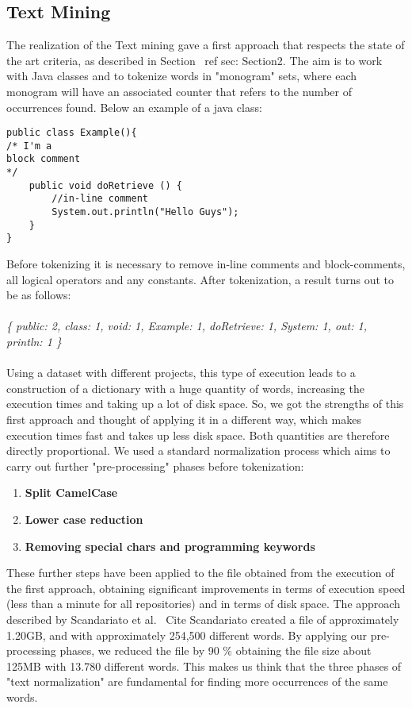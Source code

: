 \documentclass[twocolumn,10pt]{asme2ej}
\begin{document}
\subsection{Text Mining}\label{m:tm}

The realization of the Text mining gave a first approach that respects the state of the art criteria, as described in Section \ ref {sec: Section2}. The aim is to work with Java classes and to tokenize words in "monogram" sets, where each monogram will have an associated counter that refers to the number of occurrences found. Below an example of a java class:
\begin{lstlisting}
public class Example(){
/* I'm a
block comment
*/
    public void doRetrieve () {
        //in-line comment
        System.out.println("Hello Guys");
    }
}
\end{lstlisting}
Before tokenizing it is necessary to remove in-line comments and block-comments, all logical operators and any constants. After tokenization, a result turns out to be as follows:\\
\\\textit{\{ public: 2, class: 1, void: 1, Example: 1, doRetrieve: 1, System: 1, out: 1, println: 1 \}}\\
\\
Using a dataset with different projects, this type of execution leads to a construction of a dictionary with a huge quantity of words, increasing the execution times and taking up a lot of disk space. So, we got the strengths of this first approach and thought of applying it in a different way, which makes execution times fast and takes up less disk space. Both quantities are therefore directly proportional. We used a standard normalization process which aims to carry out further "pre-processing" phases before tokenization:
\begin{enumerate}
    \item \textbf{Split CamelCase }
    \item \textbf{Lower case reduction}
    \item \textbf{Removing special chars and programming keywords}
\end{enumerate}
These further steps have been applied to the file obtained from the execution of the first approach, obtaining significant improvements in terms of execution speed (less than a minute for all repositories) and in terms of disk space. The approach described by Scandariato et al. \ Cite {Scandariato} created a file of approximately 1.20GB, and with approximately 254,500 different words. By applying our pre-processing phases, we reduced the file by 90 \% obtaining the file size about 125MB with 13.780 different words. This makes us think that the three phases of "text normalization" are fundamental for finding more occurrences of the same words.
\end{document}
